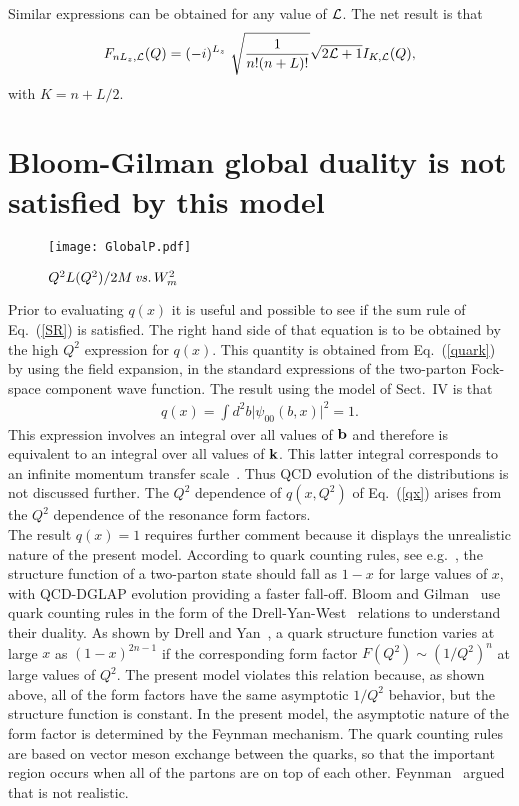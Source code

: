 \documentclass[aps,prd,amsmath,longbibliography]{revtex4-1}
\newcommand{\eq}[1]{Eq.~(\ref{#1})}
\def\bea{\begin{eqnarray}}
\def\eea{\end{eqnarray}}\def\a{\alpha}\newcommand{\bfk}{{\bf k}}\newcommand{\bfq}{{\bf q}}
\begin{document}
{    Similar expressions can be obtained for any value of ${\cal L}$. The net result is that
    \bea F_{nL_z,\cL}(Q)=(- i)^{L_z} \ \sqrt{\frac{1}{n!(n+L)!}}\sqrt{2\cL+1}I_{K,\cL}(Q),\label{fff}\eea
    with $K=n+L/2$.
    
    \section{Bloom-Gilman global duality is not satisfied by this model}
       \begin{figure}[h] \label{duality1}
		\texttt{[image: GlobalP.pdf]} 
     \caption{$Q^2 L(Q^2)/2M\, {\it vs.}\, W_m^2$ 
     }\end{figure}  


    Prior to evaluating $q(x)$ it is useful and possible to see if the sum rule of \eq{SR} is satisfied. 
    The right hand side of that equation is to be obtained by the high $Q^2$ expression for $q(x)$. 
    This quantity is obtained from  \eq{quark} by using the field expansion, in the standard expressions of the two-parton Fock-space component wave function. The result using the model of Sect.~IV is that
    \bea q(x)=\int d^2b \big|\psi_{00}(b,x)\big|^2 =1.\label{model}\eea 
This expression involves an integral over all values of ${\bf b}$ and therefore is equivalent to an integral over all values of $\bfk$. This latter integral corresponds to an infinite momentum transfer scale~\cite{Lepage:1980fj}.  Thus QCD evolution of the distributions is not discussed further. The $Q^2$ dependence of  $q(x,Q^2)$ of \eq{qx} arises from the  $Q^2$ dependence of the resonance form factors. \\

The result $q(x)=1$ requires further comment because it displays the unrealistic nature of the present model. According to quark counting rules, see e.g.~\cite{Brodsky:1994kg}, the structure function of a  two-parton state should fall as $1-x$ for large values of $x$, with QCD-DGLAP evolution providing a faster fall-off.  Bloom and Gilman~\cite{Bloom:1970xb,Bloom:1971ye} use quark counting rules in the form of the Drell-Yan-West~\cite{Drell:1969km,West:1970av} relations to understand their duality. As shown by Drell and Yan~\cite{Drell:1969km},  a quark structure function  varies at large $x$ as  $ ( 1 - x ) ^ {2 n - 1}$  if  the corresponding form factor  $F(Q^2)\sim (1/Q^2)^n$ at large values of $Q^2$. The present model violates this relation because, as shown above, all of the form factors have the same asymptotic $1/Q^2$ behavior, but the structure function is constant.  In the present model, the asymptotic nature of the form factor is determined by the Feynman mechanism. The quark counting rules are based on vector meson exchange between the quarks, so that the important region occurs when all of the partons are on top of each other. Feynman~\cite{Feynman:1973xc} argued  that is not realistic.\\


}
\end{document}
